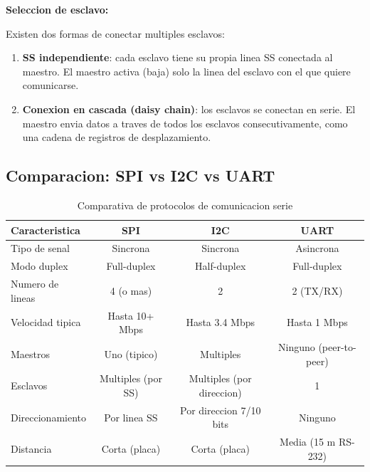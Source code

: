 \textbf{Seleccion de esclavo:}

Existen dos formas de conectar multiples esclavos:

\begin{enumerate}
    \item \textbf{SS independiente}: cada esclavo tiene su propia linea SS
    conectada al maestro. El maestro activa (baja) solo la linea del esclavo
    con el que quiere comunicarse.
    \item \textbf{Conexion en cascada (daisy chain)}: los esclavos se conectan
    en serie. El maestro envia datos a traves de todos los esclavos
    consecutivamente, como una cadena de registros de desplazamiento.
\end{enumerate}

\subsection{Comparacion: SPI vs I2C vs UART}

\begin{table}[H]
    \centering
    \caption{Comparativa de protocolos de comunicacion serie}
    \label{tab:comparativa_spi_i2c_uart}
    \small
    \begin{tabular}{|l|c|c|c|}
        \hline
        \textbf{Caracteristica} & \textbf{SPI} & \textbf{I2C} & \textbf{UART} \\
        \hline
        Tipo de senal & Sincrona & Sincrona & Asincrona \\
        \hline
        Modo duplex & Full-duplex & Half-duplex & Full-duplex \\
        \hline
        Numero de lineas & 4 (o mas) & 2 & 2 (TX/RX) \\
        \hline
        Velocidad tipica & Hasta 10+ Mbps & Hasta 3.4 Mbps & Hasta 1 Mbps \\
        \hline
        Maestros & Uno (tipico) & Multiples & Ninguno (peer-to-peer) \\
        \hline
        Esclavos & Multiples (por SS) & Multiples (por direccion) & 1 \\
        \hline
        Direccionamiento & Por linea SS & Por direccion 7/10 bits & Ninguno \\
        \hline
        Distancia & Corta (placa) & Corta (placa) & Media (15 m RS-232) \\
        \hline
    \end{tabular}
\end{table}

